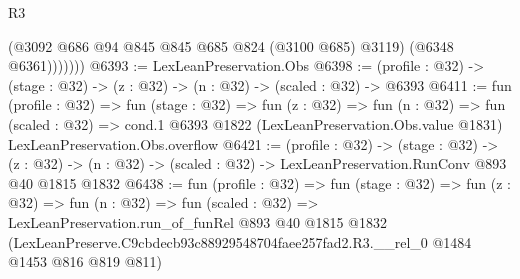 \begin{lexlean}{R3}
\begin{coremodule}
                (@3092 @686 @94 @845 @845 @685 @824 (@3100 @685) @3119)
                (@6348 @6361)))))))
@6393 := LexLeanPreservation.Obs
@6398 := (profile : @32) -> (stage : @32) -> (z : @32) -> (n : @32) -> (scaled : @32) -> @6393
@6411 := fun (profile : @32) =>
  fun (stage : @32) =>
  fun (z : @32) =>
  fun (n : @32) =>
  fun (scaled : @32) =>
  cond.{1} @6393 @1822 (LexLeanPreservation.Obs.value @1831) LexLeanPreservation.Obs.overflow
@6421 := (profile : @32) ->
  (stage : @32) ->
  (z : @32) -> (n : @32) -> (scaled : @32) -> LexLeanPreservation.RunConv @893 @40 @1815 @1832
@6438 := fun (profile : @32) =>
  fun (stage : @32) =>
  fun (z : @32) =>
  fun (n : @32) =>
  fun (scaled : @32) =>
  LexLeanPreservation.run_of_funRel
    @893
    @40
    @1815
    @1832
    (LexLeanPreserve.C9cbdecb93c88929548704faee257fad2.R3.__rel_0 @1484 @1453 @816 @819 @811)
\end{coremodule}
\end{lexlean}
